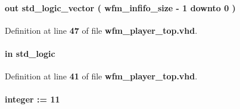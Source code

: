 \paragraph[{wfm\+\_\+infifo\+\_\+wrusedw}]{ {\bfseries \textcolor{keywordflow}{out}\textcolor{vhdlchar}{ }} {\bfseries \textcolor{comment}{std\+\_\+logic\+\_\+vector}\textcolor{vhdlchar}{ }\textcolor{vhdlchar}{(}\textcolor{vhdlchar}{ }\textcolor{vhdlchar}{ }\textcolor{vhdlchar}{ }\textcolor{vhdlchar}{ }{\bfseries {\bf wfm\+\_\+infifo\+\_\+size}} \textcolor{vhdlchar}{-\/}\textcolor{vhdlchar}{ } \textcolor{vhdldigit}{1} \textcolor{vhdlchar}{ }\textcolor{keywordflow}{downto}\textcolor{vhdlchar}{ }\textcolor{vhdlchar}{ } \textcolor{vhdldigit}{0} \textcolor{vhdlchar}{ }\textcolor{vhdlchar}{)}\textcolor{vhdlchar}{ }} \hspace{0.3cm}{\ttfamily [Port]}}\label{classwfm__player__top_a80d5a575d736e6cc2ef5a2769c308bda}


Definition at line {\bf 47} of file {\bf wfm\+\_\+player\+\_\+top.\+vhd}.

\paragraph[{wfm\+\_\+load}]{ {\bfseries \textcolor{keywordflow}{in}\textcolor{vhdlchar}{ }} {\bfseries \textcolor{comment}{std\+\_\+logic}\textcolor{vhdlchar}{ }} \hspace{0.3cm}{\ttfamily [Port]}}\label{classwfm__player__top_a3d169846da42e9b1a5f04bce97dd2fff}


Definition at line {\bf 41} of file {\bf wfm\+\_\+player\+\_\+top.\+vhd}.

\paragraph[{wfm\+\_\+outfifo\+\_\+size}]{ {\bfseries \textcolor{vhdlchar}{ }} {\bfseries \textcolor{comment}{integer}\textcolor{vhdlchar}{ }\textcolor{vhdlchar}{ }\textcolor{vhdlchar}{\+:}\textcolor{vhdlchar}{=}\textcolor{vhdlchar}{ }\textcolor{vhdlchar}{ } \textcolor{vhdldigit}{11} \textcolor{vhdlchar}{ }} \hspace{0.3cm}{\ttfamily [Generic]}}\label{classwfm__player__top_a34c7f4f72360546393d9261a065de65a}



